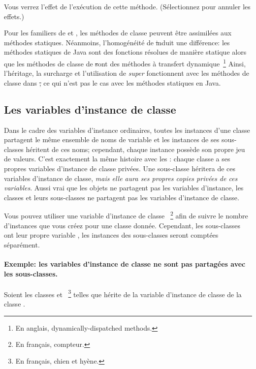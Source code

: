 \documentclass[a4paper,10pt,twoside]{book}
\begin{document}
Vous verrez l'effet de l'exécution de cette méthode.  (Sélectionnez  pour annuler les effets.)

Pour les familiers de  et ,  les méthodes de classe peuvent être assimilées aux méthodes statiques. 
Néanmoins, l'homogénéité de \st induit une différence:  les méthodes statiques de Java sont des fonctions résolues de manière statique alors que les méthodes de classe de \st sont des méthodes à transfert dynamique~\footnote{En anglais, dynamically-dispatched methods.} Ainsi, l'héritage, la surcharge et l'utilisation de \emph{super} fonctionnent avec les méthodes de classe dans \st, ce qui n'est pas le cas avec les méthodes statiques en Java.  

\subsection{Les variables d'instance de classe}
Dans le cadre des variables d'instance ordinaires, toutes les instances d'une classe partagent le même ensemble
de noms de variable et les instances de ses sous-classes héritent de ces noms; cependant, chaque instance possède son propre jeu de valeurs.
C'est exactement la même histoire avec les : chaque classe a ses propres variables d'instance de classe privées.
Une sous-classe héritera de ces  variables d'instance de classe, \emph{mais elle aura ses propres copies privées de ces variables}.
Aussi vrai que les objets ne partagent pas les variables d'instance, les classes et leurs sous-classes ne partagent pas les variables d'instance de classe.

Vous pouvez utiliser une variable d'instance de classe ~\footnote{En français, compteur.} afin de suivre le nombre d'instances que vous créez pour une classe donnée.
Cependant, les sous-classes ont leur propre variable , 
les instances des sous-classes seront comptées séparément.

\paragraph{Exemple: les variables d'instance de classe ne sont pas partagées avec les sous-classes.}
Soient les classes  et ~\footnote{En français, chien et hyène.} telles que  hérite de la variable d'instance de classe  de la classe .
\end{document}
